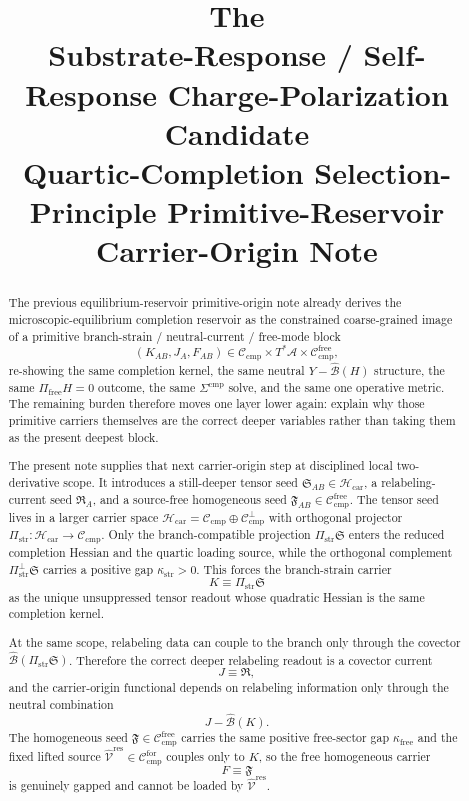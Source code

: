\documentclass[11pt]{article}
\title{\textbf{The \TheoryName{}}\\[0.4em]
\large Substrate-Response / Self-Response Charge-Polarization Candidate\\
\large Quartic-Completion Selection-Principle Primitive-Reservoir Carrier-Origin Note}
\author{}
\date{}
\newcommand{\Sub}{\mathcal A}
\newcommand{\ResidualLift}{\widehat{\mathcal V}^{\mathrm{res}}}
\newcommand{\CompClass}{\mathscr C_{\mathrm{cmp}}}
\newcommand{\CompFree}{\mathscr C_{\mathrm{cmp}}^{\mathrm{free}}}
\newcommand{\CompForced}{\mathscr C_{\mathrm{cmp}}^{\mathrm{for}}}
\newcommand{\FreeStiff}{\kappa_{\mathrm{free}}}
\newcommand{\PrimStrain}{K}
\newcommand{\PrimNeutral}{J}
\newcommand{\PrimFree}{F}
\newcommand{\CarrierClass}{\mathscr H_{\mathrm{car}}}
\newcommand{\CarrierProj}{\Pi_{\mathrm{str}}}
\newcommand{\CarrierPerp}{\Pi_{\mathrm{str}}^{\perp}}
\newcommand{\CarrierGap}{\kappa_{\mathrm{str}}}
\newcommand{\CarrierSeed}{\mathfrak S}
\newcommand{\RelabelSeed}{\mathfrak R}
\newcommand{\FreeSeed}{\mathfrak F}
\begin{document}
\maketitle

\begin{abstract}
The previous equilibrium-reservoir primitive-origin note already derives the microscopic-equilibrium completion reservoir as the constrained coarse-grained image of a primitive branch-strain / neutral-current / free-mode block
\[
(\PrimStrain_{AB},\PrimNeutral_A,\PrimFree_{AB})\in
\CompClass\times T^*\Sub\times \CompFree,
\]
re-showing the same completion kernel, the same neutral \(Y-\widehat{\mathcal B}(H)\) structure, the same \(\Pi_{\mathrm{free}}H=0\) outcome, the same \(\Sigma^{\mathrm{cmp}}\) solve, and the same one operative metric. The remaining burden therefore moves one layer lower again: explain why those primitive carriers themselves are the correct deeper variables rather than taking them as the present deepest block.

The present note supplies that next carrier-origin step at disciplined local two-derivative scope. It introduces a still-deeper tensor seed \(\CarrierSeed_{AB}\in\CarrierClass\), a relabeling-current seed \(\RelabelSeed_A\), and a source-free homogeneous seed \(\FreeSeed_{AB}\in\CompFree\). The tensor seed lives in a larger carrier space \(\CarrierClass=\CompClass\oplus \CompClass^\perp\) with orthogonal projector \(\CarrierProj:\CarrierClass\to\CompClass\). Only the branch-compatible projection \(\CarrierProj\CarrierSeed\) enters the reduced completion Hessian and the quartic loading source, while the orthogonal complement \(\CarrierPerp\CarrierSeed\) carries a positive gap \(\CarrierGap>0\). This forces the branch-strain carrier
\[
\PrimStrain\equiv \CarrierProj\CarrierSeed
\]
as the unique unsuppressed tensor readout whose quadratic Hessian is the same completion kernel.

At the same scope, relabeling data can couple to the branch only through the covector \(\widehat{\mathcal B}(\CarrierProj\CarrierSeed)\). Therefore the correct deeper relabeling readout is a covector current
\[
\PrimNeutral\equiv \RelabelSeed,
\]
and the carrier-origin functional depends on relabeling information only through the neutral combination
\[
\PrimNeutral-\widehat{\mathcal B}(\PrimStrain).
\]
The homogeneous seed \(\FreeSeed\in\CompFree\) carries the same positive free-sector gap \(\FreeStiff\) and the fixed lifted source \(\ResidualLift\in\CompForced\) couples only to \(\PrimStrain\), so the free homogeneous carrier
\[
\PrimFree\equiv \FreeSeed
\]
is genuinely gapped and cannot be loaded by \(\ResidualLift\).


\end{abstract}
\end{document}

